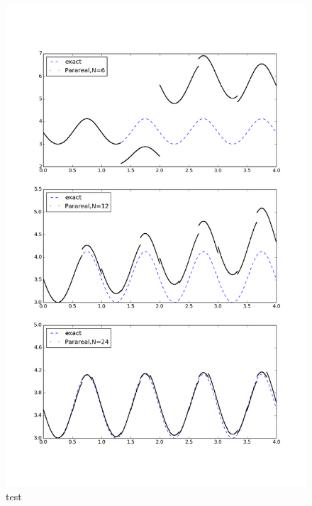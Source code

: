 \begin{figure}[h]
\caption{test}
\centering
\includegraphics[scale=0.5]{parareal_img.png}
\end{figure}